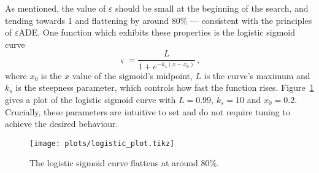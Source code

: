 As mentioned, the value of $\varepsilon$ should be small at the beginning of the search, and tending towards 1 and flattening by around 80\% --- consistent with the principles of $\varepsilon$ADE. One function which exhibits these properties is the logistic sigmoid curve
\begin{equation}\label{eq:logistic}
\varsigma = \dfrac{L}{1+e^{-k_s(x-x_0)}}\,,
\end{equation}
where $x_0$ is the $x$ value of the sigmoid's midpoint, $L$ is the curve's maximum and $k_s$ is the steepness parameter, which controls how fast the function rises. Figure~\ref{fig:logistic} gives a plot of the logistic sigmoid curve with $L=0.99$, $k_s=10$ and $x_0 = 0.2$.  Crucially, these parameters are intuitive to set and do not require tuning to achieve the desired behaviour.
\begin{figure}[h!]
  \centering
  \texttt{[image: plots/logistic\_plot.tikz]}  
  \caption{The logistic sigmoid curve flattens at around 80\%.} 
    \label{fig:logistic}
\end{figure}

